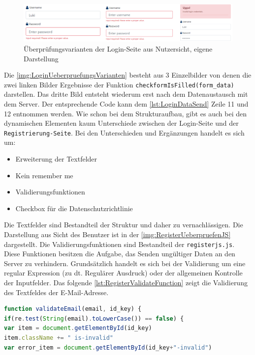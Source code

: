 \documentclass[a4paper,titlepage,halfparskip,12pt]{scrreprt}
\begin{document}
\begin{onehalfspacing}
\begin{figure}[h]
	\centering
	\includegraphics[width=\linewidth]{images/LoginUeberpruefungJSGesamt}
	\caption{Überprüfungsvarianten der Login-Seite aus Nutzersicht, eigene Darstellung}
	\label{img:LoginUeberpruefungsVarianten}
\end{figure}
Die \autoref{img:LoginUeberpruefungsVarianten} besteht aus 3 Einzelbilder von denen die zwei linken Bilder Ergebnisse der Funktion \texttt{checkformIsFilled(form\_data)} darstellen. Das dritte Bild entsteht wiederum erst nach dem Datenaustausch mit dem Server. Der entsprechende Code kann dem \autoref{lst:LoginDataSend} Zeile 11 und 12 entnommen werden. Wie schon bei dem Strukturaufbau, gibt es auch bei den dynamischen Elementen kaum Unterschiede zwischen der Login-Seite und der \texttt{Registrierung-Seite}.
Bei den Unterschieden und Ergänzungen handelt es sich um:
\begin{itemize}
	\item Erweiterung der Textfelder
	\item Kein \glqq remember me\grqq\
	\item Validierungsfunktionen
	\item Checkbox für die Datenschutzrichtlinie
\end{itemize}
Die Textfelder sind Bestandteil der Struktur und daher zu vernachlässigen. Die Darstellung aus Sicht des Benutzer ist in der \autoref{img:RegisterUeberpruefenJS} dargestellt. Die Validierungsfunktionen sind Bestandteil der \texttt{registerjs.js}. Diese Funktionen besitzen die Aufgabe, das Senden ungültiger Daten an den Server zu verhindern. Grundsätzlich handelt es sich bei der Validierung um eine regular Expression (zu dt. Regulärer Ausdruck) oder der allgemeinen Kontrolle der Inputfelder. Das folgende \autoref{lst:RegisterValidateFunction} zeigt die Validierung des Textfeldes der E-Mail-Adresse.
\begin{lstlisting}[language=Javascript,caption=Validierungsfunktion \textit{validateEmail()},label={lst:RegisterValidateFunction}]
function validateEmail(email, id_key) {
if(re.test(String(email).toLowerCase()) == false) {
var item = document.getElementById(id_key)
item.className += " is-invalid"
var error_item = document.getElementById(id_key+"-invalid")

\end{lstlisting}
\end{onehalfspacing}
\end{document}
